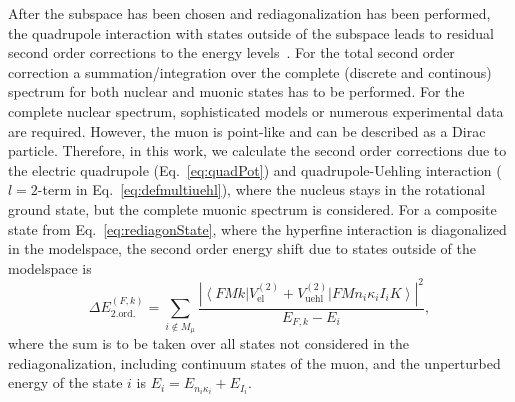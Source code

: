 After the subspace has been chosen and rediagonalization has been performed, the quadrupole interaction with states outside of the subspace leads to residual second order corrections to the energy levels~\cite{chen1970}.
For the total second order correction a summation/integration over the complete (discrete and continous) spectrum for both nuclear and muonic states has to be performed. For the complete nuclear spectrum, sophisticated models or numerous experimental data are required. However, the muon is point-like and can be described as a Dirac particle. Therefore, in this work, we calculate the second order corrections due to the electric quadrupole (Eq.~\eqref{eq:quadPot}) and quadrupole-Uehling interaction (${l}{=}{2}$-term in Eq.~\eqref{eq:defmultiuehl}), where the nucleus stays in the rotational ground state, but the complete muonic spectrum is considered.
For a composite state from Eq.~\eqref{eq:rediagonState}, where the hyperfine interaction is diagonalized in the modelspace, the second order energy shift due to states outside of the modelspace is
\begin{equation}
\Delta E_{\text{2.ord.}}^{(F,k)}= \sum_{i\notin M_{\mu}}\frac{\left|\left< FMk\right|{V_{\text{el}}^{(2)}}{+}{V_{\text{uehl}}^{(2)}}\left|FMn_i\kappa_iI_iK \right>\right|^2}{E_{F,k}-E_i},
\label{eq:second}
\end{equation}
where the sum is to be taken over all states not considered in the rediagonalization, including continuum states of the muon, and the unperturbed energy of the state $i$ is $E_i=E_{n_i\kappa_i}+E_{I_i}$.













